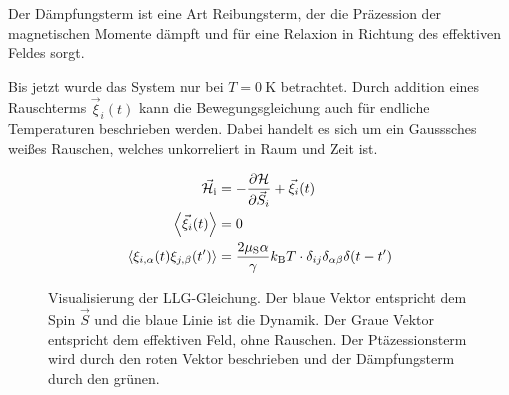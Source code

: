 \documentclass[main.tex]{subfiles}
\begin{document}
Der Dämpfungsterm ist eine Art Reibungsterm, der die Präzession der magnetischen Momente dämpft und für eine Relaxion in Richtung des effektiven Feldes sorgt.

Bis jetzt wurde das System nur bei \(T = \SI{0}{\kelvin}\) betrachtet.
Durch addition eines Rauschterms \(\vec{\xi}_i(t)\) kann die Bewegungsgleichung auch für endliche Temperaturen beschrieben werden.
Dabei handelt es sich um ein Gausssches weißes Rauschen, welches unkorreliert in Raum und Zeit ist.

\begin{align}
	\vec{\mathcal{H}}_{\text{i}} 
	& = -\pdv{\mathcal{H}}{\vec{S}_i} + \vec{\xi}_i(t) \\
	\expval{\vec{\xi}_i(t)} & = 0 \\
	\expval{\xi_{i,\alpha}(t) \xi_{j,\beta}(t')} 
	& = \frac{2\mu_\text{S} \alpha}{\gamma}k_\text{B} T \cdot \delta_{ij} \delta_{\alpha \beta}	\delta(t-t')
\end{align}

\begin{figure}[H]
	\centering
	\caption{Visualisierung der LLG-Gleichung. Der blaue Vektor entspricht dem Spin \(\vec{S}\) und die blaue Linie ist die Dynamik. Der Graue Vektor entspricht dem effektiven Feld, ohne Rauschen. Der Ptäzessionsterm wird durch den roten Vektor beschrieben und der Dämpfungsterm durch den grünen.~\cite{schlegel-master}}
	\label{fig:llg-rauschen}
\end{figure}
\end{document}

